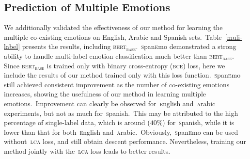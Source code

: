 \documentclass[11pt,a4paper]{article}
\begin{document}
\subsection{Prediction of Multiple Emotions}
We additionally validated the effectiveness of our method for learning the multiple co-existing emotions on English, Arabic and Spanish sets.~Table~\ref{muli-label} presents the results, including \textsc{bert$_{\text{base}}$}.~\textsc{s}pan\textsc{e}mo demonstrated a strong ability to handle multi-label emotion classification much better than \textsc{bert$_{\text{base}}$}. Since \textsc{bert$_{\text{base}}$} is trained only with binary cross-entropy (\textsc{bce}) loss, here we include the results of our method trained only with this loss function.~\textsc{s}pan\textsc{e}mo still achieved consistent improvement as the number of co-existing emotions increases, showing the usefulness of our method in learning multiple emotions.~Improvement can clearly be observed for~\textsc{e}nglish and~\textsc{a}rabic experiments, but not as much for~\textsc{s}panish.~This may be attributed to the high percentage of single-label data, which is around ($40\%$) for~\textsc{s}panish, while it is lower than that for both~\textsc{e}nglish and~\textsc{a}rabic.~Obviously,~\textsc{s}pan\textsc{e}mo can be used without~\textsc{lca} loss, and still obtain descent performance. Nevertheless, training our method jointly with the~\textsc{lca} loss leads to better results.
\end{document}
